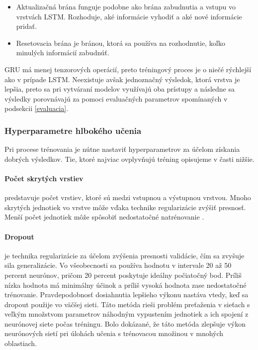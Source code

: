 \begin{itemize}
    \item Aktualizačná brána funguje podobne ako brána zabudnutia a vstupu vo vrstvách LSTM. Rozhoduje, aké informácie vyhodiť a aké nové informácie pridať.
    \item Resetovacia brána je bránou, ktorá sa používa na rozhodnutie, koľko minulých informácií zabudnúť.
\end{itemize}

GRU má menej tenzorových operácií, preto tréningový proces je o niečé rýchlejší ako v prípade LSTM. Neexistuje avšak jednoznačný výsledok, ktorá vrstva je lepšia, preto sa pri vytváraní modelov využívajú oba prístupy a následne sa výsledky porovnávajú za pomoci evaluačných parametrov spomínaných v podsekcii \ref{evaluacia}. 

\subsubsection{Hyperparametre hlbokého učenia}
Pri procese trénovania je nútne nastaviť hyperparametrov za účelom získania dobrých výsledkov. Tie, ktoré najviac ovplyvňujú tréning opisujeme v časti nižšie.
\paragraph{Počet skrytých vrstiev} predstavuje počet vrstiev, ktoré sú medzi vstupnou a výstupnou vrstvou. Mnoho skrytých jednotiek vo vrstve môže vďaka technike regularizácie zvýšiť presnosť. Menší počet jednotiek môže spôsobiť nedostatočné natrénovanie \cite{hyperparams}.

\paragraph{Dropout} je technika regularizácie za účelom zvýšenia presnosti validácie, čím sa zvyšuje sila generalizácie. Vo všeobecnosti sa používa hodnotu v intervale 20 až 50 percent neurónov, pričom 20 percent poskytuje ideálny počiatočný bod. Príliš nízka hodnota má minimálny účinok a príliš vysoká hodnota zase nedostatočné trénovanie. Pravdepodobnosť dosiahnutia lepšieho výkonu nastáva vtedy, keď sa dropout použije vo väčšej sieti. Táto metóda rieši problém preťaženia v sieťach s veľkým množstvom parametrov náhodným vypustením jednotiek a ich spojení z neurónovej siete počas tréningu. Bolo dokázané, že táto metóda zlepšuje výkon neurónových sietí pri úlohách učenia s trénovacou množinou v mnohých oblastiach. 

